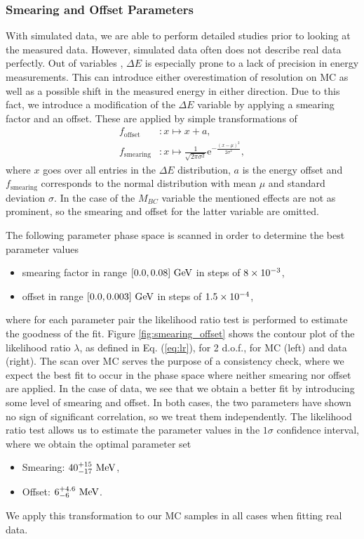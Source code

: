 \subsubsection{Smearing and Offset Parameters}\label{sec:smearing-and-offset-parameters}
With simulated data, we are able to perform detailed studies prior to looking at the measured data. However, simulated data often does not describe real data perfectly. Out of variables \vars, $\Delta E$ is especially prone to a lack of precision in energy measurements. This can introduce either overestimation of resolution on MC as well as a possible shift in the measured energy in either direction. Due to this fact, we introduce a modification of the $\Delta E$ variable by applying a smearing factor and an offset. These are applied by simple transformations of 
\begin{align}
\label{eq:smearingoffset}
f_{\mathrm{offset}}&: x \mapsto x + a, \\
f_{\mathrm{smearing}}&: x \mapsto \frac{1}{\sqrt{2\pi \sigma^2}} \mathrm{e}^{-\frac{(x-\mu)^2}{2\sigma^2}},
\end{align}
where $x$ goes over all entries in the $\Delta E$ distribution, $a$ is the energy offset and $f_{\mathrm{smearing}}$ corresponds to the normal distribution with mean $\mu$ and standard deviation $\sigma$. In the case of the $M_{BC}$ variable the mentioned effects are not as prominent, so the smearing and offset for the latter variable are omitted. 

The following parameter phase space is scanned in order to determine the best parameter values
\begin{itemize}
	\item smearing factor in range $[0.0 ,0.08]\mathrm{~GeV}$ in steps of $8\times 10^{-3}$,
	\item offset in range $[0.0, 0.003]\mathrm{~GeV}$ in steps of $1.5\times 10^{-4}$,
\end{itemize}
where for each parameter pair the likelihood ratio test is performed to estimate the goodness of the fit. Figure \ref{fig:smearing_offset} shows the contour plot of the likelihood ratio $\lambda$, as defined in Eq. (\ref{eq:lr}), for 2 d.o.f., for MC (left) and data (right). The scan over MC serves the purpose of a consistency check, where we expect the best fit to occur in the phase space where neither smearing nor offset are applied. In the case of data, we see that we obtain a better fit by introducing some level of smearing and offset. In both cases, the two parameters have shown no sign of significant correlation, so we treat them independently. The likelihood ratio test allows us to estimate the parameter values in the $1\sigma$ confidence interval, where we obtain the optimal parameter set
\begin{itemize}
	\item Smearing: $40_{-17}^{+15}\mathrm{~MeV}$,
	\item Offset: $6_{-6}^{+4.6}\mathrm{~MeV}$.
\end{itemize}
We apply this transformation to our MC samples in all cases when fitting real data.

